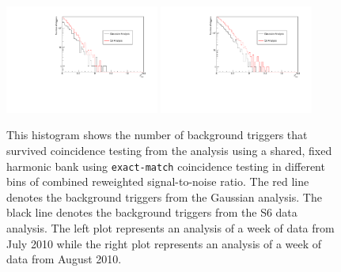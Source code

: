 \documentclass[12pt]{iopart} \usepackage{graphicx,amssymb}
\begin{document}
\begin{figure}[tbp]
\begin{center}
\includegraphics[width=0.45\textwidth]{figures/histograms/same_harm_exact-match_gaussian_vs_s6_w1.pdf}
\includegraphics[width=0.45\textwidth]{figures/histograms/same_harm_exact-match_gaussian_vs_s6_w2.pdf}
\caption{This histogram shows the number of background triggers that survived
coincidence testing from the analysis using a shared, fixed harmonic bank
using \texttt{exact-match} coincidence testing in different bins of combined
reweighted signal-to-noise ratio. The red line denotes the background triggers from the Gaussian
analysis.  The black line denotes the background triggers from the S6 data
analysis. The left plot represents an analysis of a week of data from July 2010
while the right plot represents an analysis of a week of data from August 2010.}
\label{fig:exact_hist}
\end{center}
\end{figure}
 
\end{document}
